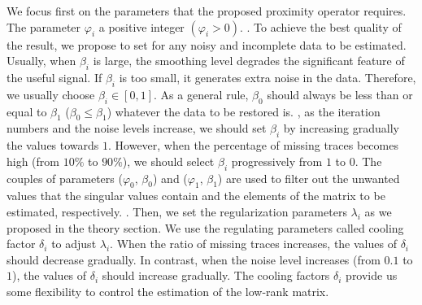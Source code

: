 We focus first on the parameters that the proposed proximity operator requires. The parameter $\varphi_i$  a positive integer $(\varphi_i>0)$. . To achieve the best quality of the result, we propose to set  for any noisy and incomplete data to be estimated.  Usually, when $\beta_i$ is large, the smoothing level degrades the significant feature of the useful signal. If $\beta_i$ is too small, it generates extra noise in the data. Therefore, we usually choose $\beta_i \in \left[0, 1\right]$. As a general rule, $\beta_0$ should always be less than or equal to $\beta_1$ ($\beta_0 \leq \beta_1$) whatever the data to be restored is. , as the iteration numbers and the noise levels increase, we should set $\beta_i$ by increasing gradually the values towards $1$. However, when the percentage of missing traces becomes high (from $10\% $ to $90\%$), we should select $\beta_i$ progressively from $1$ to $0$. The couples of parameters ($\varphi_0$, $\beta_0$) and ($\varphi_1$, $\beta_1$) are used to filter out the unwanted values that the singular values contain and the elements of the matrix to be estimated, respectively. . Then, we set the regularization parameters $\lambda_i$ as we proposed in the theory section. We use the regulating parameters called cooling factor $\delta_i$ to adjust $\lambda_i$. When the ratio of missing traces increases, the values of $\delta_i$ should decrease gradually. In contrast, when the noise level increases (from $0.1$ to $1$), the values of $\delta_i$ should increase gradually. The cooling factors $\delta_i$ provide us some flexibility to control the estimation of the low-rank matrix. 